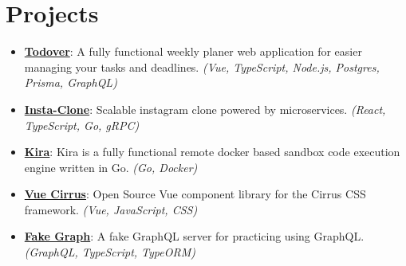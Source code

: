 \documentclass[letterpaper,11pt]{article}
\newcommand{\resumeItem}[2]{
  \item\small{
    \textbf{#1}{: #2 \vspace{-2pt}}
  }
}
\newcommand{\resumeSubItem}[2]{\resumeItem{#1}{#2}\vspace{-4pt}}
\newcommand{\resumeSubHeadingListStart}{\begin{itemize}[leftmargin=*]}
\newcommand{\resumeSubHeadingListEnd}{\end{itemize}}
\begin{document}
\section{Projects}
  \resumeSubHeadingListStart
    \resumeSubItem{\href{https://github.com/FlorianWoelki/todover}{Todover}}
      {A fully functional weekly planer web application for easier managing your tasks and deadlines.
      \textit{(Vue, TypeScript, Node.js, Postgres, Prisma, GraphQL)}}
    \resumeSubItem{\href{https://github.com/FlorianWoelki/insta-clone}{Insta-Clone}}
      {Scalable instagram clone powered by microservices.
      \textit{(React, TypeScript, Go, gRPC)}}
    \resumeSubItem{\href{https://github.com/FlorianWoelki/kira}{Kira}}
      {Kira is a fully functional remote docker based sandbox code execution engine written in Go.
      \textit{(Go, Docker)}}
    \resumeSubItem{\href{https://github.com/FlorianWoelki/vue-cirrus}{Vue Cirrus}}
      {Open Source Vue component library for the Cirrus CSS framework.
      \textit{(Vue, JavaScript, CSS)}}
    \resumeSubItem{\href{https://github.com/daycademy/fake-graph}{Fake Graph}}
      {A fake GraphQL server for practicing using GraphQL.
      \textit{(GraphQL, TypeScript, TypeORM)}}
  \resumeSubHeadingListEnd


\end{document}
